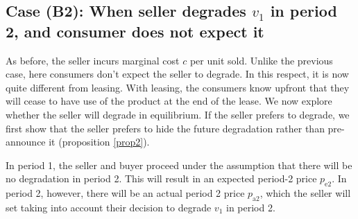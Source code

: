 \documentclass[isre,blindrev]{informs3} %
\begin{document}
\subsection{Case (B2): When seller degrades \(v_1\) in period 2, and consumer does not expect it}\label{innovate-no-degrade-unaware}

As before, the seller incurs marginal cost $c$ per unit sold. Unlike the previous case, here consumers don't expect the seller to degrade. In this respect, it is now quite different from leasing. With leasing, the consumers know upfront that they will cease to have use of the product at the end of the lease. We now explore whether the seller will degrade in equilibrium. If the seller prefers to degrade, we first show that the seller prefers to hide the future degradation rather than pre-announce it (proposition \ref{prop2}). 

In period 1, the seller and buyer proceed under the assumption that there will be no degradation in period 2. This will result in an expected period-2 price \(p_{\text{e2}}\). In period 2, however, there will be an actual period 2 price \(p_{\text{a2}}\), which the seller will set taking into account their decision to degrade \(v_1\) in period 2.
\end{document}
